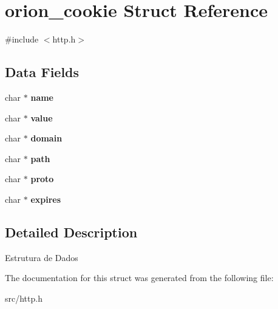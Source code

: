 \hypertarget{structorion__cookie}{
\section{orion\_\-cookie Struct Reference}
\label{structorion__cookie}
}


{\ttfamily \#include $<$http.h$>$}

\subsection*{Data Fields}
\begin{DoxyCompactItemize}
\item 
\hypertarget{structorion__cookie_aa76a669a14beb20c92bada477ffed7a6}{
char $\ast$ {\bfseries name}}
\label{structorion__cookie_aa76a669a14beb20c92bada477ffed7a6}

\item 
\hypertarget{structorion__cookie_a298cedc7eb63d5c59897d9f1a07cc42a}{
char $\ast$ {\bfseries value}}
\label{structorion__cookie_a298cedc7eb63d5c59897d9f1a07cc42a}

\item 
\hypertarget{structorion__cookie_ada151b95c02be55986318f3d4ef91f01}{
char $\ast$ {\bfseries domain}}
\label{structorion__cookie_ada151b95c02be55986318f3d4ef91f01}

\item 
\hypertarget{structorion__cookie_a6e2b4e4e8a4b9321ca2be14558e0e24a}{
char $\ast$ {\bfseries path}}
\label{structorion__cookie_a6e2b4e4e8a4b9321ca2be14558e0e24a}

\item 
\hypertarget{structorion__cookie_ae84d7817b2fe8d18180de3eee80f257b}{
char $\ast$ {\bfseries proto}}
\label{structorion__cookie_ae84d7817b2fe8d18180de3eee80f257b}

\item 
\hypertarget{structorion__cookie_a7a701c0e65db53e75929a46ed0097d7a}{
char $\ast$ {\bfseries expires}}
\label{structorion__cookie_a7a701c0e65db53e75929a46ed0097d7a}

\end{DoxyCompactItemize}


\subsection{Detailed Description}
Estrutura de Dados 

The documentation for this struct was generated from the following file:\begin{DoxyCompactItemize}
\item 
src/http.h\end{DoxyCompactItemize}
